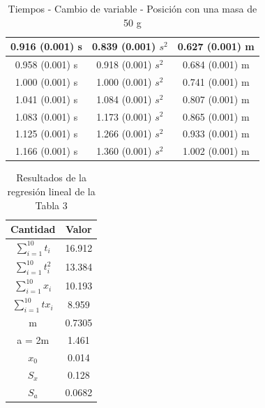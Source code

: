 \documentclass[12pt,a4paper]{article}
\begin{document}
\begin{table}[h!]
\begin{center}
\begin{tabular}{|c|c|c|}
0.916 (0.001) s & 0.839 (0.001) $s^2$ & 0.627 (0.001) m \\ \hline
0.958 (0.001) s & 0.918 (0.001) $s^2$ & 0.684 (0.001) m \\ \hline
1.000 (0.001) s & 1.000 (0.001) $s^2$ & 0.741 (0.001) m \\ \hline
1.041 (0.001) s & 1.084 (0.001) $s^2$ & 0.807 (0.001) m \\ \hline
1.083 (0.001) s & 1.173 (0.001) $s^2$ & 0.865 (0.001) m \\ \hline
1.125 (0.001) s & 1.266 (0.001) $s^2$ & 0.933 (0.001) m \\ \hline
1.166 (0.001) s & 1.360 (0.001) $s^2$ & 1.002 (0.001) m \\ \hline

\end{tabular}
\caption{Tiempos - Cambio de variable - Posición con una masa de 50 g}
\end{center}
\end{table}



\begin{table}[h!]
\begin{center}
\begin{tabular}{|c|c|}
\hline
Cantidad & Valor \\ \hline
$ \sum^{10}_{i = 1} t_i $ & 16.912 \\ \hline
$\sum^{10}_{i = 1} t_i^2$ & 13.384 \\ \hline
$\sum^{10}_{i = 1} x_i$ & 10.193 \\ \hline
$\sum^{10}_{i = 1} tx_i$ & 8.959 \\ \hline
m & 0.7305 \\ \hline
a = 2m & 1.461 \\ \hline
$x_0$ & 0.014 \\ \hline
$S_x$ & 0.128 \\ \hline
$S_a$ & 0.0682 \\ \hline

\end{tabular}
\caption{Resultados de la regresión lineal de la Tabla 3}
\end{center}
\end{table}

\clearpage
\end{document}
